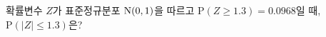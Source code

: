 확률변수 $Z$가 표준정규분포 $\mathrm{N}(0{,}\mkern3mu\mathopen{}1)$을 따르고 $\mathrm{P}(Z\ge 1.3)=0.0968$일 때, $\mathrm{P}(|Z|\le 1.3)$은?
